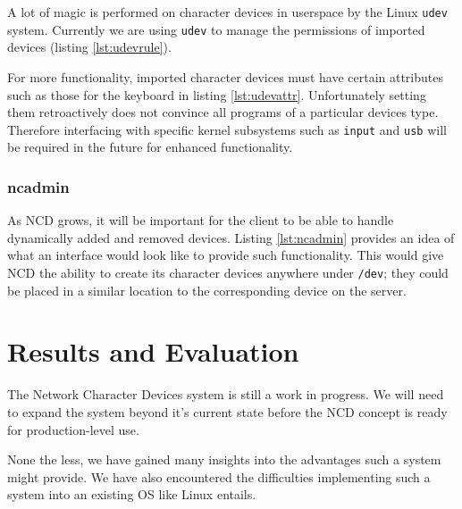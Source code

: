 \documentclass[11pt,twocolumn]{article}
\begin{document}


A lot of magic is performed on character devices in userspace by
the Linux \texttt{udev} system.
Currently we are using \texttt{udev} to manage the
permissions of imported devices (listing \ref{lst:udevrule}).



For more functionality, imported character devices must have certain
attributes such as those for the keyboard in listing \ref{lst:udevattr}.
Unfortunately setting them retroactively does not convince all programs
of a particular devices type. Therefore interfacing with specific kernel
subsystems such as \texttt{input} and \texttt{usb} will be required in
the future for enhanced functionality.

\subsubsection{ncadmin}



As NCD grows, it will be important for the client to be able to handle
dynamically added and removed devices. Listing \ref{lst:ncadmin}
provides an idea of what an interface would look like to provide such
functionality. This would give NCD the ability to create its character
devices anywhere under \texttt{/dev}; they could be placed in a similar
location to the corresponding device on the server.


\section{Results and Evaluation}
\label{sec:results}

The Network Character Devices system is still a work in
progress. We will need to expand the system beyond it's current state
before the NCD concept is ready for production-level use.

None the less, we have gained many insights into the advantages such a
system might provide. We have also encountered the difficulties
implementing such a system into an existing OS like Linux entails.
\end{document}

